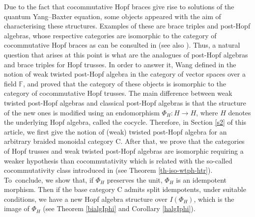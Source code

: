 \documentclass[10pt,a4paper]{amsart}
\numberwithin{equation}{section}
\begin{document}
Due to the fact that cocommutative Hopf braces give rise to solutions of the quantum Yang--Baxter equation, some objects appeared with the aim of characterising these structures. Examples of these are brace triples and post-Hopf algebras, whose respective categories are isomorphic to the category of cocommutative Hopf braces as can be consulted in \cite[Theorems~2.18 and~3.16]{FGR} (see also \cite{LST}). Thus, a natural question that arises at this point is what are the analogues of post-Hopf algebras and brace triples for Hopf trusses. In order to answer it, Wang defined in \cite{Wang} the notion of weak twisted post-Hopf algebra in the category of vector spaces over a field $\mathbb{F}$, and proved that the category of these objects is isomorphic to the category of cocommutative Hopf trusses. The main difference between weak twisted post-Hopf algebras and classical post-Hopf algebras is that the structure of the new ones is modified using an endomorphism $\Phi_{H}\colon H\rightarrow H$, where $H$ denotes the underlying Hopf algebra, called the cocycle. Therefore, in Section \ref{s2} of this article, we first give the notion of (weak) twisted post-Hopf algebra for an arbitrary braided monoidal category {\sf C}. After that, we prove that the categories of Hopf trusses and weak twisted post-Hopf algebras are isomorphic requiring a weaker hypothesis than cocommutativity which is related with the so-called cocommutativity class introduced in \cite{CCH} (see Theorem \ref{th-iso-wtph-htr}). To~conclude, we show that, if $\Phi_{H}$ preserves the unit, $\Phi_{H}$ is an idempotent morphism. Then if the base category {\sf C} admits split idempotents, under suitable conditions, we have a new Hopf algebra structure over $I(\Phi_{H})$, which is the image of $\Phi_{H}$ (see Theorem \ref{bialgIphi} and Corollary \ref{halgIphi}).
\end{document}
